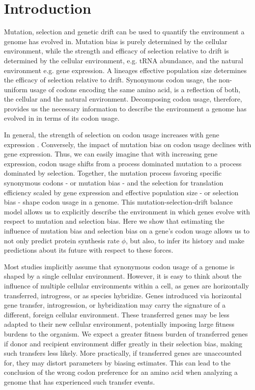 \newpage


\section{Introduction}

Mutation, selection and genetic drift can be used to quantify the environment a genome has evolved in.
Mutation bias is purely determined by the cellular environment, while the strength and efficacy of selection relative to drift is determined by the cellular environment, e.g. tRNA abundance, and the natural environment e.g. gene expression.
A lineages effective population size determines the efficacy of selection relative to drift.
Synonymous codon usage, the non-uniform usage of codons encoding the same amino acid, is a reflection of both, the cellular and the natural environment.
Decomposing codon usage, therefore, provides us the necessary information to describe the environment a genome has evolved in in terms of its codon usage. 

In general, the strength of selection on codon usage increases with gene expression \citep{ikemura1985, gouy1982}.
Conversely, the impact of mutation bias on codon usage declines with gene expression.
Thus, we can easily imagine that with increasing gene expression, codon usage shifts from a process dominated mutation to a process dominated by selection.
Together, the mutation process favoring specific synonymous codons - or mutation bias -  and the selection for translation efficiency scaled by gene expression and effective population size - or selection bias -  shape codon usage in a genome.
This mutation-selection-drift balance model allows us to explicitly describe the environment in which genes evolve with respect to mutation and selection bias.
Here we show that estimating the influence of mutation bias and selection bias on a gene's codon usage allows us to not only predict protein synthesis rate $\phi$, but also, to infer its history and make predictions about its future with respect to these forces.

Most studies implicitly assume that synonymous codon usage of a genome is shaped by a single cellular environment. 
However, it is easy to think about the influence of multiple cellular environments within a cell, as genes are horizontally transferred, introgress, or as species hybridize.
Genes introduced via horizontal gene transfer, introgression, or hybridization may carry the signature of a different, foreign cellular environment.
These transferred genes may be less adapted to their new cellular environment, potentially imposing large fitness burdens to the organism.
We expect a greater fitness burden of transferred genes if donor and recipient environment differ greatly in their selection bias, making such transfers less likely.
More practically, if transferred genes are unaccounted for, they may distort parameters by biasing estimates.
This can lead to the conclusion of the wrong codon preference for an amino acid when analyzing a genome that has experienced such transfer events.  

